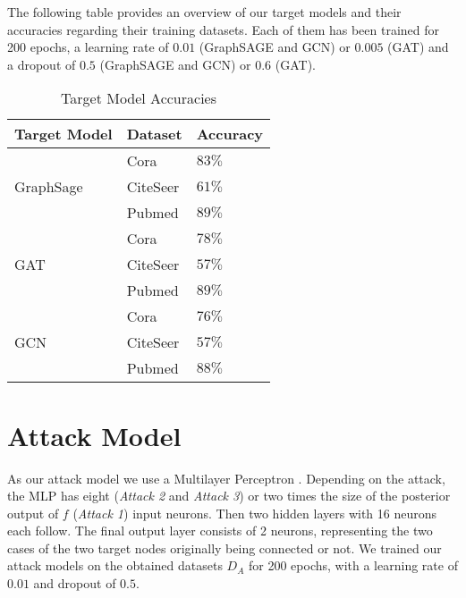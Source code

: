     The following table provides an overview of our target models and their accuracies regarding their training datasets.
    Each of them has been trained for 200 epochs, a learning rate of $0.01$ (GraphSAGE and GCN) or $0.005$ (GAT) and a dropout of $0.5$ (GraphSAGE and GCN) or $0.6$ (GAT). 
    \vspace{0.48cm}
    \begin{table}[!h]
      \centering
      \footnotesize
      \begin{tabular}{l|l|l|}
        \toprule
        Target Model & Dataset & Accuracy \\
        \midrule
          \multirow{3}{4em}{GraphSage} & Cora & $83\%$ \\
          & CiteSeer & $61\%$ \\
          & Pubmed & $89\%$ \\

          \multirow{3}{4em}{GAT} & Cora & $78\%$ \\
          & CiteSeer & $57\%$ \\
          & Pubmed & $89\%$ \\

          \multirow{3}{4em}{GCN} & Cora & $76\%$ \\
          & CiteSeer & $57\%$ \\
          & Pubmed & $88\%$ \\
          
        \bottomrule
      \end{tabular}
      \caption{Target Model Accuracies}
      \label{table:target-models}
    \end{table}

  \section{Attack Model}
    As our attack model we use a Multilayer Perceptron .
    Depending on the attack, the MLP has eight (\emph{Attack 2} and \emph{Attack 3}) or two times the size of the posterior output of $f$ (\emph{Attack 1}) input neurons.
    Then two hidden layers with 16 neurons each follow.
    The final output layer consists of 2 neurons, representing the two cases of the two target nodes originally being connected or not.
    We trained our attack models on the obtained datasets $D_A$ for 200 epochs, with a learning rate of $0.01$ and dropout of $0.5$.
